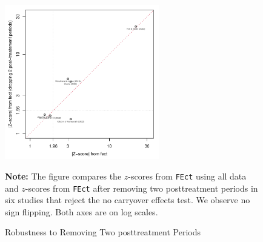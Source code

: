 \documentclass[12pt]{article}
\begin{document}
\begin{figure}[!ht]
\caption{Robustness to Removing Two posttreatment Periods}\label{fg:carryover}
\begin{minipage}{1\linewidth}{
\begin{center}
\includegraphics[width = 0.6\textwidth]{figure/summary/alter_fect_carryover.pdf}
\end{center}\vspace{-1em}
\footnotesize\textbf{Note:} The figure compares the $z$-scores from \texttt{FEct} using all data and $z$-scores from \texttt{FEct} after removing two posttreatment periods in six studies that reject the no carryover effects test. We observe no sign flipping. Both axes are on log scales.}
\end{minipage}\vspace{-0.5em}
\end{figure}


\vspace{7em}


\clearpage
\end{document}
